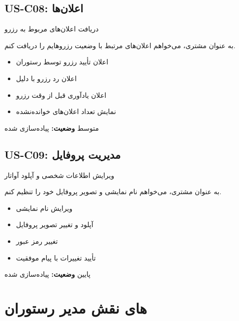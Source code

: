 \documentclass[12pt, a4paper]{article}
\begin{document}
\subsection{US-C08: اعلان‌ها}
\begin{description}[rightmargin=0.5cm]
  \item[عنوان:] دریافت اعلان‌های مربوط به رزرو
  \item[داستان:] به عنوان مشتری، می‌خواهم اعلان‌های مرتبط با وضعیت رزروهایم را دریافت کنم.
  \item[معیارهای پذیرش:]
  \begin{itemize}[rightmargin=0.5cm]
    \item اعلان تأیید رزرو توسط رستوران
    \item اعلان رد رزرو با دلیل
    \item اعلان یادآوری قبل از وقت رزرو
    \item نمایش تعداد اعلان‌های خوانده‌نشده
  \end{itemize}
  \item[اولویت:] متوسط \quad \textbf{وضعیت:} پیاده‌سازی شده
\end{description}

\subsection{US-C09: مدیریت پروفایل}
\begin{description}[rightmargin=0.5cm]
  \item[عنوان:] ویرایش اطلاعات شخصی و آپلود آواتار
  \item[داستان:] به عنوان مشتری، می‌خواهم نام نمایشی و تصویر پروفایل خود را تنظیم کنم.
  \item[معیارهای پذیرش:]
  \begin{itemize}[rightmargin=0.5cm]
    \item ویرایش نام نمایشی
    \item آپلود و تغییر تصویر پروفایل
    \item تغییر رمز عبور
    \item تأیید تغییرات با پیام موفقیت
  \end{itemize}
  \item[اولویت:] پایین \quad \textbf{وضعیت:} پیاده‌سازی شده
\end{description}

\newpage

\section{های نقش مدیر رستوران}
\end{document}
